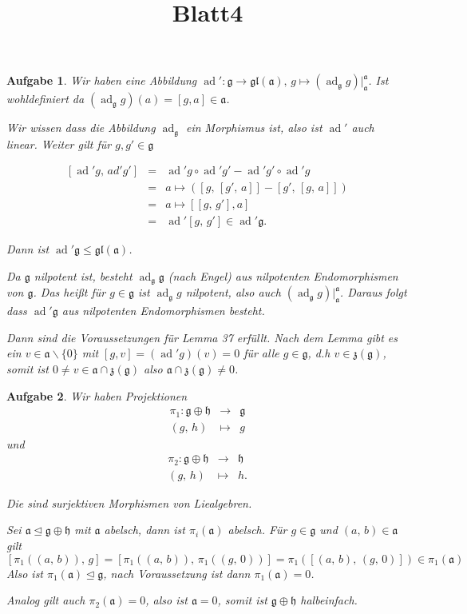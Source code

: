 \documentclass[12pt,leqno,twoside]{article}
\newcommand{\0}{\circ}
\newcommand{\barcl}{\begin{array}{rcl}}
\newcommand{\ea}{\end{array}}
\DeclareMathOperator{\ad}{ad}
\newcommand{\mf}{\mathfrak}
\newtheorem{AG}{Aufgabe}
\begin{document}
\title{Blatt4}
\begin{AG}
\rm
Wir haben eine Abbildung $\ad':  \mf{g} \to \mf{gl}(\mf{a}),\, g\mapsto (\ad_{\mf{g}}g)|_{\mf{a}}^\mf{a}$. Ist wohldefiniert da $(\ad_{\mf{g}}g)(a) = [g,a] \in \mf{a}$.

Wir wissen dass die Abbildung $\ad_{\mf{g}}$ ein Morphismus ist, also ist $\ad'$ auch linear. Weiter gilt f\"ur $g,g' \in \mf{g}$

\[
\barcl
[\ad'g,\, ad'g'] & = & \ad'g \0 \ad'g' - \ad'g'\0\ad'g\\
				 & = &a\mapsto ( [g,\,[g',\,a]] - [g',\,[g,\,a]]) \\
				 & = & a\mapsto [[g,\,g'],a] \\
				 & = &\ad'[g,\,g'] \in \ad'\mf{g}.
\ea
\]

Dann ist $\ad'\mf{g} \leqslant \mf{gl}(\mf{a})$. 


Da $\mf{g}$ nilpotent ist, besteht $\ad_{\mf{g}}\mf{g}$ (nach Engel) aus nilpotenten Endomorphismen von $\mf{g}$. Das hei{\ss}t f\"ur $g\in \mf{g}$ ist $\ad_{\mf{g}}g$ nilpotent, also auch $(\ad_{\mf{g}}g)|_{\mf{a}}^{\mf{a}}$. Daraus folgt dass $\ad'\mf{g}$ aus nilpotenten Endomorphismen besteht.

Dann sind die Voraussetzungen f\"ur Lemma 37 erf\"ullt. Nach dem Lemma gibt es ein $v \in \mf{a}\backslash\{0\}$ mit $[g,v]=(\ad'g)(v) = 0$ f\"ur alle $g \in \mf{g}$, d.h $v \in \mf{z}(\mf{g})$, somit ist $0\neq v \in \mf{a}\cap \mf{z}(\mf{g})$ also $\mf{a}\cap \mf{z}(\mf{g}) \neq 0$.


 
\end{AG}

\begin{AG}
\rm
Wir haben Projektionen
\[
\barcl
\pi_1: \mf{g} \oplus \mf{h} & \to     & \mf{g}\\
					 (g,\,h)&\mapsto  & g
\ea
\]
und
\[
\barcl
\pi_2: \mf{g} \oplus \mf{h} & \to     & \mf{h}\\
(g,\,h)&\mapsto  & h.
\ea
\]

Die sind surjektiven Morphismen von Liealgebren.

Sei $\mf{a}\trianglelefteq \mf{g} \oplus \mf{h}$ mit $\mf{a}$ abelsch, dann ist $\pi_i(\mf{a})$ abelsch. F\"ur $g\in\mf{g}$ und $(a,\, b)\in \mf{a}$ gilt
\[
[\pi_1((a,\,b)),\, g] = [\pi_1((a,\,b)),\, \pi_1((g,\,0))] = \pi_1([(a,\,b),\,(g,\,0)]) \in \pi_1(\mf{a})
\]
Also ist $\pi_1(\mf{a}) \trianglelefteq \mf{g}$, nach Voraussetzung ist dann $\pi_1(\mf{a}) = 0$.

Analog gilt auch  $\pi_2(\mf{a}) = 0$, also ist $\mf{a} = 0$, somit ist $\mf{g} \oplus \mf{h}$ halbeinfach.
\end{AG}
\end{document}
